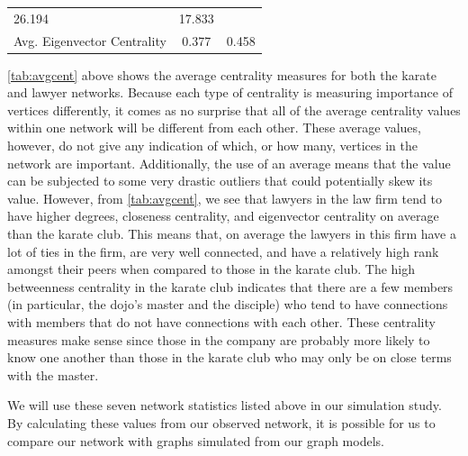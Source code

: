 \documentclass[12pt,twoside]{amherstthesis}
\begin{document}
\begin{longtable}[]{@{}lcc@{}}
\begin{minipage}[t]{0.29\columnwidth}
  26.194\strut
  \end{minipage} & \begin{minipage}[t]{0.29\columnwidth}\centering\strut
  17.833\strut
  \end{minipage}\tabularnewline
  \begin{minipage}[t]{0.34\columnwidth}\raggedright\strut
  Avg. Eigenvector Centrality\strut
  \end{minipage} & \begin{minipage}[t]{0.29\columnwidth}\centering\strut
  0.377\strut
  \end{minipage} & \begin{minipage}[t]{0.29\columnwidth}\centering\strut
  0.458\strut
  \end{minipage}\tabularnewline
  \bottomrule
  \end{longtable}
  
  \autoref{tab:avgcent} above shows the average centrality measures for
  both the karate and lawyer networks. Because each type of centrality is
  measuring importance of vertices differently, it comes as no surprise
  that all of the average centrality values within one network will be
  different from each other. These average values, however, do not give
  any indication of which, or how many, vertices in the network are
  important. Additionally, the use of an average means that the value can
  be subjected to some very drastic outliers that could potentially skew
  its value. However, from \autoref{tab:avgcent}, we see that lawyers in
  the law firm tend to have higher degrees, closeness centrality, and
  eigenvector centrality on average than the karate club. This means that,
  on average the lawyers in this firm have a lot of ties in the firm, are
  very well connected, and have a relatively high rank amongst their peers
  when compared to those in the karate club. The high betweenness
  centrality in the karate club indicates that there are a few members (in
  particular, the dojo's master and the disciple) who tend to have
  connections with members that do not have connections with each other.
  These centrality measures make sense since those in the company are
  probably more likely to know one another than those in the karate club
  who may only be on close terms with the master.
  
  We will use these seven network statistics listed above in our
  simulation study. By calculating these values from our observed network,
  it is possible for us to compare our network with graphs simulated from
  our graph models.
  
\end{document}
